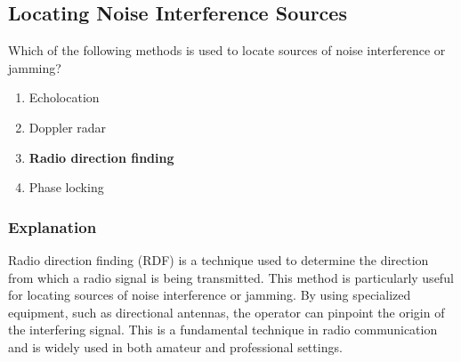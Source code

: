 \subsection{Locating Noise Interference Sources}
\label{T8C01}

\begin{tcolorbox}[colback=gray!10!white,colframe=black!75!black,title=T8C01]
Which of the following methods is used to locate sources of noise interference or jamming?
\begin{enumerate}[noitemsep]
    \item Echolocation
    \item Doppler radar
    \item \textbf{Radio direction finding}
    \item Phase locking
\end{enumerate}
\end{tcolorbox}

\subsubsection*{Explanation}
Radio direction finding (RDF) is a technique used to determine the direction from which a radio signal is being transmitted. This method is particularly useful for locating sources of noise interference or jamming. By using specialized equipment, such as directional antennas, the operator can pinpoint the origin of the interfering signal. This is a fundamental technique in radio communication and is widely used in both amateur and professional settings.